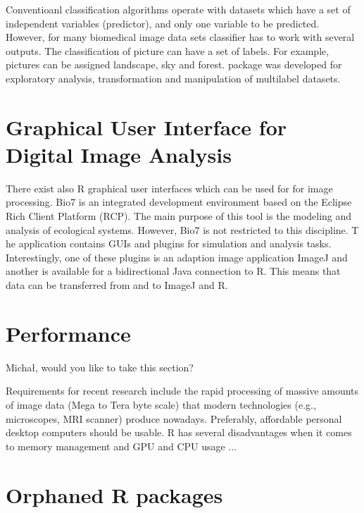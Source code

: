 Conventioanl classification algorithms operate with datasets which have a set 
of independent variables (predictor), and only one variable to be predicted. 
However, for many biomedical image data sets classifier has to work with 
several outputs. The classification of picture can have a set of labels. For 
example, pictures can be assigned landscape, sky and forest.  
package \citep{charte_working_2015} was developed for exploratory analysis, 
transformation and manipulation of multilabel datasets.

\section{Graphical User Interface for Digital Image Analysis}

There exist also R graphical user interfaces \citep{rodiger_rkward:_2012} which 
can be used for for image processing. Bio7 is an integrated development 
environment based on the Eclipse Rich Client Platform (RCP). The main purpose of 
this tool is the modeling and analysis of ecological systems. However, Bio7 is 
not restricted to this discipline. T he application contains GUIs and plugins 
for simulation and analysis tasks. Interestingly, one of these plugins is an 
adaption image application ImageJ and another is available for a bidirectional 
Java connection to R. This means that data can be transferred from and to ImageJ 
and R.

\section{Performance}

Micha\l{}, would you like to take this section?


Requirements for recent research include the rapid processing of massive amounts 
of image data (Mega to Tera byte scale) that modern technologies (e.g., 
microscopes, MRI scanner) produce nowadays. Preferably, affordable personal desktop
computers should be usable. R has several disadvantages when it comes to memory management
and GPU and CPU usage ...

\section{Orphaned R packages}

